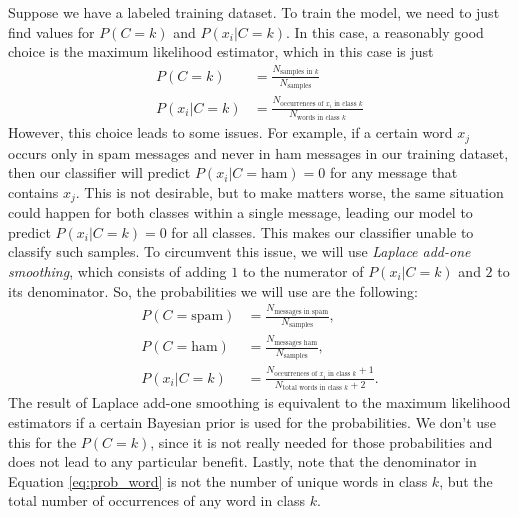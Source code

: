 Suppose we have a labeled training dataset.
To train the model, we need to just find values for $P(C=k)$ and $P(x_i|C=k)$.
In this case, a reasonably good choice is the maximum likelihood estimator, which in this case is just
\begin{align*}
P(C=k) &=\frac{N_{\text{samples in $k$}}}{N_{\text{samples}}}
\\
P(x_i | C=k) &= \frac{N_{\text{occurrences of $x_i$ in class $k$}}}{N_{\text{words in class $k$}}}
\end{align*}
However, this choice leads to some issues.
For example, if a certain word $x_j$ occurs only in spam messages and never in ham messages in our training dataset, then our classifier will predict $P(x_i | C=\text{ham})=0$ for any message that contains $x_j$.
This is not desirable, but to make matters worse, the same situation could happen for both classes within a single message, leading our model to predict
$P(x_i|C=k)=0$ for all classes.
This makes our classifier unable to classify such samples.
To circumvent this issue, we will use \emph{Laplace add-one smoothing}, which consists of adding $1$ to the numerator of $P(x_i | C=k)$ and $2$ to its denominator.
So, the probabilities we will use are the following:
\begin{align}
\label{eq:prob_spam}
    P(C=\text{spam}) &= \frac{N_{\text{messages in spam}}}{N_{\text{samples}}},
    \\
    P(C=\text{ham}) &= \frac{N_{\text{messages ham}}}{N_{\text{samples}}},
    \label{eq:prob_ham}
\\
    P(x_i | C=k) &= \frac{N_{\text{occurrences of $x_i$ in class $k$}}+1}{N_{\text{total words in class $k$}}+2}.
\label{eq:prob_word}
\end{align}
The result of Laplace add-one smoothing is equivalent to the maximum likelihood estimators if a certain Bayesian prior is used for the probabilities.
We don't use this for the $P(C=k)$, since it is not really needed for those probabilities and does not lead to any particular benefit.
Lastly, note that the denominator in Equation \ref{eq:prob_word} is not the number of unique words in class $k$, but the total number of occurrences of any word in class $k$.

